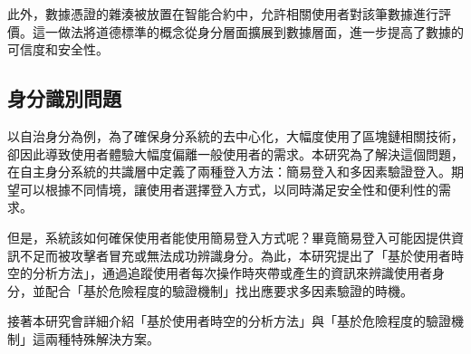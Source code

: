 此外，數據憑證的雜湊被放置在智能合約中，允許相關使用者對該筆數據進行評價。這一做法將道德標準的概念從身分層面擴展到數據層面，進一步提高了數據的可信度和安全性。
\subsection{身分識別問題}
以自治身分為例，為了確保身分系統的去中心化，大幅度使用了區塊鏈相關技術，卻因此導致使用者體驗大幅度偏離一般使用者的需求。本研究為了解決這個問題，在自主身分系統的共識層中定義了兩種登入方法：簡易登入和多因素驗證登入。期望可以根據不同情境，讓使用者選擇登入方式，以同時滿足安全性和便利性的需求。

但是，系統該如何確保使用者能使用簡易登入方式呢？畢竟簡易登入可能因提供資訊不足而被攻擊者冒充或無法成功辨識身分。為此，本研究提出了「基於使用者時空的分析方法」，通過追蹤使用者每次操作時夾帶或產生的資訊來辨識使用者身分，並配合「基於危險程度的驗證機制」找出應要求多因素驗證的時機。

接著本研究會詳細介紹「基於使用者時空的分析方法」與「基於危險程度的驗證機制」這兩種特殊解決方案。
